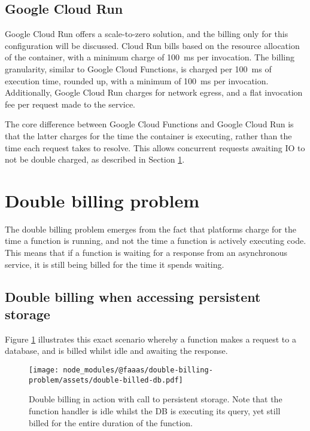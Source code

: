 \subsection{Google Cloud Run}
\label{sec:cloud-run-billing-model}
Google Cloud Run offers a scale-to-zero solution, and the billing only for this configuration will be discussed. Cloud Run bills based on the resource allocation of the container, with a minimum charge of \SI{100}{\milli\second} per invocation\cite{PricingCloudRun}. The billing granularity, similar to Google Cloud Functions, is charged per \SI{100}{\milli\second} of execution time, rounded up, with a minimum of \SI{100}{\milli\second} per invocation. Additionally, Google Cloud Run charges for network egress, and a flat invocation fee per request made to the service.

The core difference between Google Cloud Functions and Google Cloud Run is that the latter charges for the time the container is executing, rather than the time each request takes to resolve. This allows concurrent requests awaiting IO to not be double charged, as described in Section \ref{sec:double-billing-problem}.

\section{Double billing problem}
\label{sec:double-billing-problem}

The double billing problem emerges from the fact that \faas{} platforms charge for the time a function is running, and not the time a function is actively executing code. This means that if a function is waiting for a response from an asynchronous service, it is still being billed for the time it spends waiting.

\subsection{Double billing when accessing persistent storage}
Figure \ref{fig:double-billing-db} illustrates this exact scenario whereby a function makes a request to a database, and is billed whilst idle and awaiting the response.

\begin{figure}[t]
    \texttt{[image: node\_modules/@faaas/double-billing-problem/assets/double-billed-db.pdf]}
    \caption{Double billing in action with call to persistent storage. Note that the function handler is idle whilst the DB is executing its query, yet still billed for the entire duration of the function.}
    \label{fig:double-billing-db}
\end{figure}

